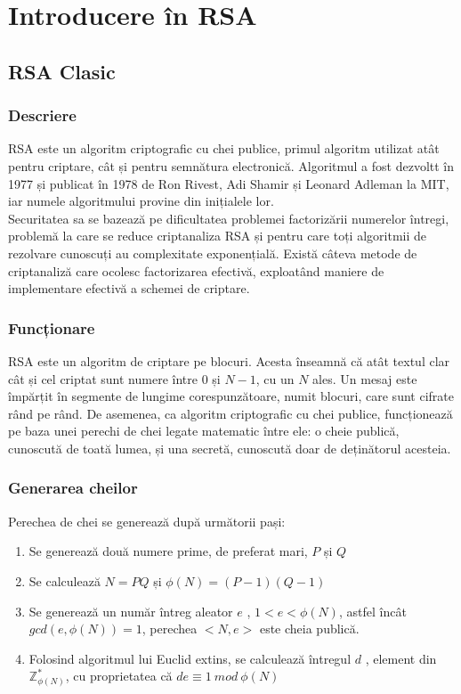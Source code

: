 \documentclass[12]{report}
\begin{document}
\tableofcontents
\chapter{Introducere în RSA}

\section{RSA Clasic}
\subsection{Descriere}
RSA este un algoritm criptografic cu chei publice, primul algoritm utilizat atât pentru criptare, cât și pentru semnătura electronică. Algoritmul a fost dezvoltt în 1977 și publicat în 1978 de Ron Rivest, Adi Shamir și Leonard Adleman la MIT, iar numele algoritmului provine din inițialele lor. \\
Securitatea sa se bazează pe dificultatea problemei factorizării numerelor întregi, problemă la care se reduce criptanaliza RSA și pentru care toți algoritmii de rezolvare cunoscuți au complexitate exponențială. Există câteva metode de criptanaliză care ocolesc factorizarea efectivă, exploatând maniere de implementare efectivă a schemei de criptare.
\subsection{Funcționare}
RSA este un algoritm de criptare pe blocuri. Acesta înseamnă că atât textul clar cât și cel criptat sunt numere între 0 și $N-1$, cu un $N$ ales. Un mesaj este împărțit în segmente de lungime corespunzătoare, numit blocuri, care sunt cifrate rând pe rând. De asemenea, ca algoritm criptografic cu chei publice, funcționează pe baza unei perechi de chei legate matematic între ele: o cheie publică, cunoscută de toată lumea, și una secretă, cunoscută doar de deținătorul acesteia.
\subsection{Generarea cheilor}
Perechea de chei se generează după următorii pași:
\begin{enumerate}
\item Se generează două numere prime, de preferat mari, $P$ și $Q$
\item Se calculează $N=PQ$ și $\phi(N)=(P-1)(Q-1)$
\item Se generează un număr întreg aleator $e$ , $1<e<\phi(N)$, astfel încât $gcd(e,\phi(N))=1$, perechea $<N,e>$ este cheia publică.
\item Folosind algoritmul lui Euclid extins, se calculează întregul $d$ , element din $\mathbb{Z}_{\phi(N)}^{*}$, cu proprietatea că $de \equiv 1 \ mod \ \phi(N)$
\end{enumerate}
\end{document}
